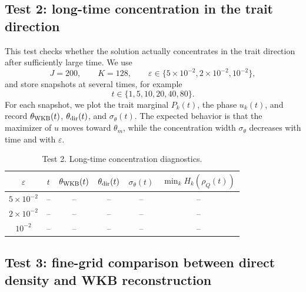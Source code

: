 \documentclass[11pt]{article}
\begin{document}
\subsection{Test 2: long-time concentration in the trait direction}\label{subsec:test_long_time_concentration_new}

This test checks whether the solution actually concentrates in the trait direction after sufficiently large time.  We use
\[
    J=200,
    \qquad K=128,
    \qquad \varepsilon\in\{5\times10^{-2},2\times10^{-2},10^{-2}\},
\]
and store snapshots at several times, for example
\[
    t\in\{1,5,10,20,40,80\}.
\]
For each snapshot, we plot the trait marginal \(P_k(t)\), the phase \(u_k(t)\), and record \(\theta_{\rm WKB}(t)\), \(\theta_{\rm dir}(t)\), and \(\sigma_\theta(t)\).  The expected behavior is that the maximizer of \(u\) moves toward \(\theta_m\), while the concentration width \(\sigma_\theta\) decreases with time and with \(\varepsilon\).

\begin{table}[ht]
\centering
\caption{Test 2. Long-time concentration diagnostics.}
\begin{tabular}{cccccc}
\toprule
$\varepsilon$ & $t$ & $\theta_{\rm WKB}(t)$ & $\theta_{\rm dir}(t)$ & $\sigma_\theta(t)$ & $\min_k H_k(\rho_Q(t))$\\
\midrule
$5\times10^{-2}$ & -- & -- & -- & -- & --\\
$2\times10^{-2}$ & -- & -- & -- & -- & --\\
$10^{-2}$ & -- & -- & -- & -- & --\\
\bottomrule
\end{tabular}
\end{table}

\subsection{Test 3: fine-grid comparison between direct density and WKB reconstruction}\label{subsec:test_fine_grid_n_new}
\end{document}
